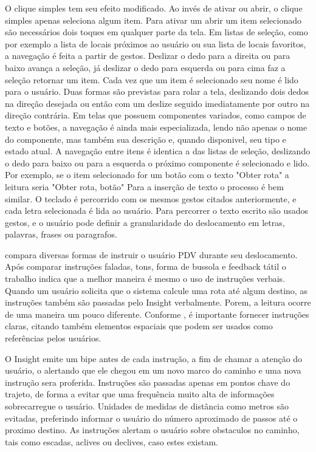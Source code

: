\documentclass[english,brazilian]{UNISINOSmonografia}
\begin{document}
O clique simples tem seu efeito modificado. Ao invés de ativar ou abrir, o clique simples apenas seleciona algum item. Para ativar um abrir um item selecionado são necessários dois toques em qualquer parte da tela. Em listas de seleção, como por exemplo a lista de locais próximos ao usuário ou sua lista de locais favoritos, a navegação é feita a partir de gestos. Deslizar o dedo para a direita ou para baixo avança a seleção, já deslizar o dedo para esquerda ou para cima faz a seleção retornar um item. Cada vez que um item é selecionado seu nome é lido para o usuário. Duas formas são previstas para rolar a tela, deslizando dois dedos na direção desejada ou então com um deslize seguido imediatamente por outro na direção contrária. Em telas que possuem componentes variados, como campos de texto e botões, a navegação é ainda mais especializada, lendo não apenas o nome do componente, mas também sua descrição e, quando disponivel, seu tipo e estado atual. A navegação entre itens é identica a das listas de seleção, deslizando o dedo para baixo ou para a esquerda o próximo componente é selecionado e lido. Por exemplo, se o item selecionado for um botão com o texto "Obter rota" a leitura seria "Obter rota, botão"
Para a inserção de texto o processo é bem similar. O teclado é percorrido com os mesmos gestos citados anteriormente, e cada letra selecionada é lida ao usuário. Para percorrer o texto escrito são usados gestos, e o usuário pode definir a granularidade do deslocamento em letras, palavras, frases ou paragrafos.

 compara diversas formas de instruir o usuário PDV durante seu deslocamento. Após comparar instruções faladas, tons, forma de bussola e feedback tátil o trabalho indica que a melhor maneira é mesmo o uso de instruções verbais. Quando um usuário solicita que o sistema calcule uma rota até algum destino, as instruções também são passadas pelo Insight verbalmente. Porem, a leitura ocorre de uma maneira um pouco diferente. Conforme , é importante fornecer instruções claras, citando também elementos espaciais que podem ser usados como referências pelos usuários.

O Insight emite um bipe antes de cada instrução, a fim de chamar a atenção do usuário, o alertando que ele chegou em um novo marco do caminho e uma nova instrução sera proferida. Instruções são passadas apenas em pontos chave do trajeto, de forma a evitar que uma frequência muito alta de informações sobrecarregue o usuário. Unidades de medidas de distância como metros são evitadas, preferindo informar o usuário do número aproximado de passos até o proximo destino. As instruções alertam o usuário sobre obstaculos no caminho, tais como escadas, aclives ou declives, caso estes existam.
\end{document}
